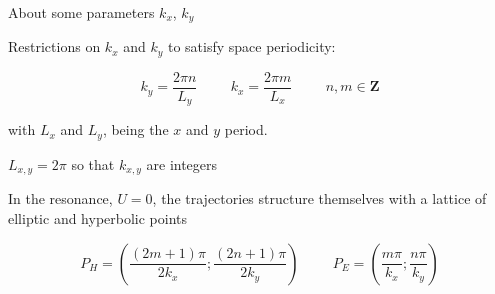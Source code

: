 \documentclass[10pt]{beamer}
\begin{document}
\begin{frame}{About some parameters $k_x$, $k_y$}

Restrictions on $k_x$ and $k_y$ to satisfy space periodicity:

\begin{equation}
k_{y} = \frac{2 \pi n}{L_y}  \hspace{1cm} k_{x} = \frac{2\pi m }{L_x} \hspace{1cm} n,m \in \mathbf{Z}
\end{equation}

with $L_x$ and $L_y$, being the $x$ and $y$ period. 

$L_{x,y} = 2\pi$ so that $k_{x,y}$ are integers

In the resonance, $U=0$, the trajectories structure themselves with a lattice of elliptic and hyperbolic points

\begin{equation}
P_H = \left(\frac{(2m+1)\pi}{2k_x};\frac{(2n+1)\pi}{2k_y}\right) \hspace{1cm} P_E = \left(\frac{m\pi}{k_x};\frac{n\pi}{k_y}\right)
\end{equation}



\end{frame}
\end{document}
